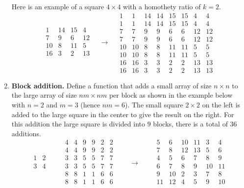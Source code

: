 \documentclass[11pt,class=report,crop=false]{standalone}
\begin{document}
\begin{activite}
\begin{enumerate}
Here is an example of a square $4\times 4$ with a homothety ratio of $k=2$.
$$  
  \begin{array}{c|c|c|c}  
  1& 14& 15& 4\\\hline
  7& 9& 6& 12\\\hline
  10& 8& 11& 5\\\hline
  16& 3& 2& 13\\    
  \end{array} 
\quad  \longrightarrow \quad 
  \begin{array}{cc|cc|cc|cc}
 1& 1&14&14&15&15& 4& 4\\
  1& 1&14&14&15&15& 4& 4\\\hline
  7& 7& 9& 9& 6& 6&12&12\\
  7& 7& 9& 9& 6& 6&12&12\\\hline
 10&10& 8& 8&11&11& 5& 5\\
 10&10& 8& 8&11&11& 5& 5\\\hline
 16&16& 3& 3& 2& 2&13&13\\
 16&16& 3& 3& 2& 2&13&13
 \end{array}
  $$
  
\item \textbf{Block addition.} Define a  function that adds a small array of size $n \times n$ to the large array of size $nm \times nm$ per block as shown in the example below with $n=2$ and $m=3$ (hence $nm=6$). The small square $2 \times 2$ on the left is added to the large square in the center to give the result on the right. For this addition the large square is divided into $9$ blocks, there is a total of $36$ additions.
$$
  \begin{array}{cc} 
  1& 2  \\
  3& 4  \\
  \end{array}
  \qquad
  \begin{array}{cc|cc|cc}  
  4& 4& 9& 9& 2& 2  \\
  4& 4& 9& 9& 2& 2  \\\hline
  3& 3& 5& 5& 7& 7  \\
  3& 3& 5& 5& 7& 7  \\\hline
  8& 8& 1& 1& 6& 6  \\
  8& 8& 1& 1& 6& 6  \\
  \end{array}
  \qquad  \longrightarrow \qquad
  \begin{array}{cc|cc|cc}
  5& 6&10&11& 3& 4  \\
  7& 8&12&13& 5& 6  \\\hline
  4& 5& 6& 7& 8& 9  \\
  6& 7& 8& 9&10&11  \\\hline
  9&10& 2& 3& 7& 8  \\
 11&12& 4& 5& 9&10  \\
  \end{array}
$$


\end{enumerate}
\end{activite}
\end{document}
